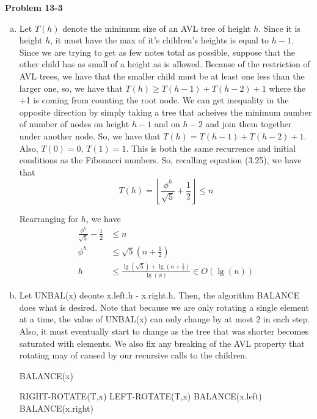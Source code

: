 \documentclass{article}
\begin{document}
\noindent\textbf{ Problem 13-3} \\

\begin{enumerate}[a.]
\item
Let $T(h)$ denote the minimum size of an AVL tree of height $h$.  Since it is height $h$, it must have the max of it's children's heights is equal to $h-1$. Since we are trying to get as few notes total as possible, suppose that the other child has as small of a height as is allowed. Because of the restriction of AVL trees, we have that the smaller child must be at least one less than the larger one, so, we have that $T(h) \ge T(h-1) + T(h-2) +1$ where the +1 is coming from counting the root node. We can get inequality in the opposite direction by simply taking a tree that acheives the minimum number of number of nodes on height $h-1$ and on $h-2$ and join them together under another node. So, we have that $T(h) = T(h-1)+T(h-2)+1$. Also, $T(0) = 0$, $T(1) = 1$. This is both the same recurrence and initial conditions as the Fibonacci numbers. So, recalling equation (3.25), we have that
\[
T(h) = \left\lfloor \frac{\phi^h}{\sqrt{5}} +\frac{1}{2} \right\rfloor \le n
\]

Rearranging for $h$, we have
\begin{align*}
\frac{\phi^h}{\sqrt{5}} -\frac{1}{2}  &\le n\\
\phi^h  &\le\sqrt{5}\left( n + \frac{1}{2} \right)\\
h &\le \frac{\lg(\sqrt{5}) + \lg(n + \frac{1}{2})}{\lg(\phi)} \in O(\lg(n))
\end{align*}

\item
Let UNBAL(x) deonte x.left.h - x.right.h. Then, the algorithm BALANCE does what is desired. Note that because we are only rotating a single element at a time, the value of UNBAL(x) can only change by at most 2 in each step. Also, it must eventually start to change as the tree that was shorter becomes saturated with elements. We also fix any breaking of the AVL property that rotating may of caused by our recursive calls to the children.
\begin{algorithm}
\caption{BALANCE(x)}
\begin{algorithmic}
\State RIGHT-ROTATE(T,x)
\Else
\State LEFT-ROTATE(T,x)
\EndIf
\State BALANCE(x.left)
\State BALANCE(x.right)
\EndWhile
\end{algorithmic}
\end{algorithm}



\end{enumerate}
\end{document}
